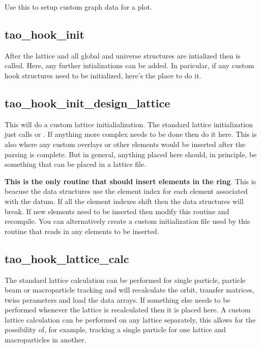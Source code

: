 Use this to setup custom graph data for a plot.

\subsection{tao\_hook\_init}

After the lattice and all global and universe structures are intialized then
 is called. Here, any further intializations can be added. In
paricular, if any custom hook structures need to be initialized, here's the
place to do it.

\subsection{tao\_hook\_init\_design\_lattice}

This will do a custom lattice initialialization. The standard lattice
initialization just calls  or . If anything more
complex needs to be done then do it here. This is also where any custom overlays
or other elements would be inserted after the parsing is complete. But in
general, anything placed here should, in principle, be something that can be
placed in a lattice file. 

\textbf{This is the only routine that should insert elements in the ring}. This
is beacuse the \tao data structures use the element index for each element
associated with the datum. If all the element indexes shift then the data
structures will break. If new elements need to be inserted then modify this
routine and recompile. You can alternatively create a custom initialization file
used by this routine that reads in any elements to be inserted.

\subsection{tao\_hook\_lattice\_calc}

The standard lattice calculation can be performed for single particle, particle
beam or macroparticle tracking and will recalculate the orbit, transfer
matrices, twiss perameters and load the data arrays. If something else needs to
be performed whenever the lattice is recalculated then it is placed here. A
custom lattice calculation can be performed on any lattice separately, this
allows for the possibility of, for example, tracking a single particle for one
lattice and macroparticles in another.

